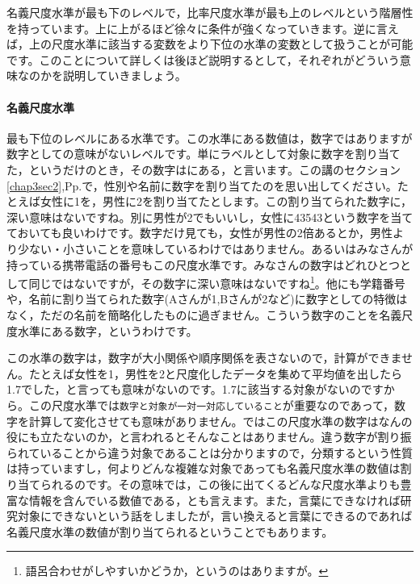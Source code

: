 \documentclass{ltjsbook}
\begin{document}
名義尺度水準が最も下のレベルで，比率尺度水準が最も上のレベルという階層性を持っています。上に上がるほど徐々に条件が強くなっていきます。逆に言えば，上の尺度水準に該当する変数をより下位の水準の変数として扱うことが可能です。このことについて詳しくは後ほど説明するとして，それぞれがどういう意味なのかを説明していきましょう。

\paragraph{名義尺度水準}
最も下位のレベルにある水準です。この水準にある数値は，数字ではありますが数字としての意味がないレベルです。単にラベルとして対象に数字を割り当てた，というだけのとき，その数字はにある，と言います。この講のセクション\ref{chap3sec2},Pp.\pageref{chap3sec2}で，性別や名前に数字を割り当てたのを思い出してください。たとえば女性に1を，男性に2を割り当てたとします。この割り当てられた数字に，深い意味はないですね。別に男性が2でもいいし，女性に43543という数字を当てておいても良いわけです。数字だけ見ても，女性が男性の2倍あるとか，男性より少ない・小さいことを意味しているわけではありません。あるいはみなさんが持っている携帯電話の番号もこの尺度水準です。みなさんの数字はどれひとつとして同じではないですが，その数字に深い意味はないですね\footnote{語呂合わせがしやすいかどうか，というのはありますが。}。他にも学籍番号や，名前に割り当てられた数字(Aさんが1,Bさんが2など)に数字としての特徴はなく，ただの名前を簡略化したものに過ぎません。こういう数字のことを名義尺度水準にある数字，というわけです。

この水準の数字は，数字が大小関係や順序関係を表さないので，計算ができません。たとえば女性を1，男性を2と尺度化したデータを集めて平均値を出したら1.7でした，と言っても意味がないのです。1.7に該当する対象がないのですから。この尺度水準では\texttt{数字と対象が一対一対応していること}が重要なのであって，数字を計算して変化させても意味がありません。ではこの尺度水準の数字はなんの役にも立たないのか，と言われるとそんなことはありません。違う数字が割り振られていることから違う対象であることは分かりますので，分類するという性質は持っていますし，何よりどんな複雑な対象であっても名義尺度水準の数値は割り当てられるのです。その意味では，この後に出てくるどんな尺度水準よりも豊富な情報を含んでいる数値である，とも言えます。また，言葉にできなければ研究対象にできないという話をしましたが，言い換えると言葉にできるのであれば名義尺度水準の数値が割り当てられるということでもあります。
\end{document}
